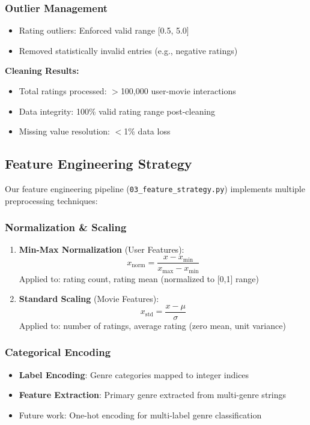 \documentclass[11pt,a4paper]{article}
\begin{document}
\subsubsection{Outlier Management}
\begin{itemize}
    \item Rating outliers: Enforced valid range [0.5, 5.0]
    \item Removed statistically invalid entries (e.g., negative ratings)
\end{itemize}

\textbf{Cleaning Results:}
\begin{itemize}
    \item Total ratings processed: $>$100,000 user-movie interactions
    \item Data integrity: 100\% valid rating range post-cleaning
    \item Missing value resolution: $<$1\% data loss
\end{itemize}

\subsection{Feature Engineering Strategy}

Our feature engineering pipeline (\texttt{03\_feature\_strategy.py}) implements multiple preprocessing techniques:

\subsubsection{Normalization \& Scaling}
\begin{enumerate}
    \item \textbf{Min-Max Normalization} (User Features):
    \begin{equation}
        x_{\text{norm}} = \frac{x - x_{\min}}{x_{\max} - x_{\min}}
    \end{equation}
    Applied to: rating count, rating mean (normalized to [0,1] range)
    
    \item \textbf{Standard Scaling} (Movie Features):
    \begin{equation}
        x_{\text{std}} = \frac{x - \mu}{\sigma}
    \end{equation}
    Applied to: number of ratings, average rating (zero mean, unit variance)
\end{enumerate}

\subsubsection{Categorical Encoding}
\begin{itemize}
    \item \textbf{Label Encoding}: Genre categories mapped to integer indices
    \item \textbf{Feature Extraction}: Primary genre extracted from multi-genre strings
    \item Future work: One-hot encoding for multi-label genre classification
\end{itemize}
\end{document}
